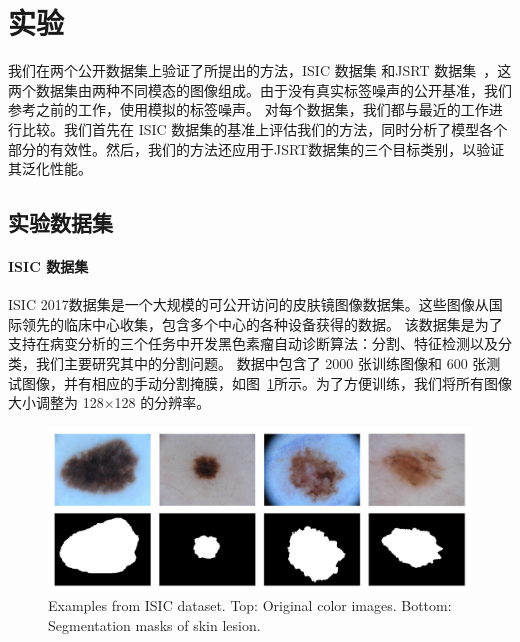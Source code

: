 \section{实验}

我们在两个公开数据集上验证了所提出的方法，ISIC 数据集\citep{Gutman2018SkinLA} 和JSRT 数据集~\citep{Shiraishi2000DevelopmentOA,Ginneken2006SegmentationOA}，这两个数据集由两种不同模态的图像组成。由于没有真实标签噪声的公开基准，我们参考之前的工作，使用模拟的标签噪声。
对每个数据集，我们都与最近的工作进行比较。我们首先在 ISIC 数据集的基准上评估我们的方法，同时分析了模型各个部分的有效性。然后，我们的方法还应用于JSRT数据集的三个目标类别，以验证其泛化性能。

\subsection{实验数据集}
\paragraph{ISIC 数据集}
ISIC 2017数据集\citep{Gutman2018SkinLA}是一个大规模的可公开访问的皮肤镜图像数据集。这些图像从国际领先的临床中心收集，包含多个中心的各种设备获得的数据。
该数据集是为了支持在病变分析的三个任务中开发黑色素瘤自动诊断算法：分割、特征检测以及分类，我们主要研究其中的分割问题。
数据中包含了 2000 张训练图像和 600 张测试图像，并有相应的手动分割掩膜，如图~\ref{fig:isic_intro}所示。为了方便训练，我们将所有图像大小调整为 128$\times$128 的分辨率。
    \begin{figure}[tbp]
        \centering 
        \includegraphics[width=1.0\textwidth]{img/c4/c_isic.png}
        {Examples from ISIC dataset. Top: Original color images. Bottom: Segmentation masks of skin lesion.}
        \label{fig:isic_intro}
    \end{figure}


